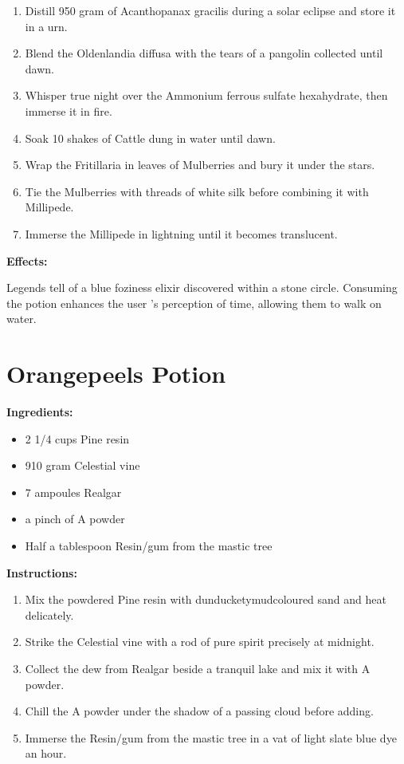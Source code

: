 \documentclass{article}
\begin{document}
\begin{enumerate}
  \item Distill 950 gram of Acanthopanax gracilis during a solar eclipse and store it in a urn.
  \item Blend the Oldenlandia diffusa with the tears of a pangolin collected until dawn.
  \item Whisper true night over the Ammonium ferrous sulfate hexahydrate, then immerse it in fire.
  \item Soak 10 shakes of Cattle dung in water until dawn.
  \item Wrap the Fritillaria in leaves of Mulberries and bury it under the stars.
  \item Tie the Mulberries with threads of white silk before combining it with Millipede.
  \item Immerse the Millipede in lightning until it becomes translucent.
\end{enumerate}

\textbf{Effects:}

Legends tell of a blue foziness elixir discovered within a stone circle. Consuming the potion enhances the user 's perception of time, allowing them to walk on water.

\newpage
\section*{Orangepeels Potion}

\textbf{Ingredients:}

\begin{itemize}
  \item 2 1/4 cups Pine resin
  \item 910 gram Celestial vine
  \item 7 ampoules Realgar
  \item a pinch of A powder
  \item Half a tablespoon Resin/gum from the mastic tree
\end{itemize}

\textbf{Instructions:}

\begin{enumerate}
  \item Mix the powdered Pine resin with dunducketymudcoloured sand and heat delicately.
  \item Strike the Celestial vine with a rod of pure spirit precisely at midnight.
  \item Collect the dew from Realgar beside a tranquil lake and mix it with A powder.
  \item Chill the A powder under the shadow of a passing cloud before adding.
  \item Immerse the Resin/gum from the mastic tree in a vat of light slate blue dye an hour.
\end{enumerate}
\end{document}
